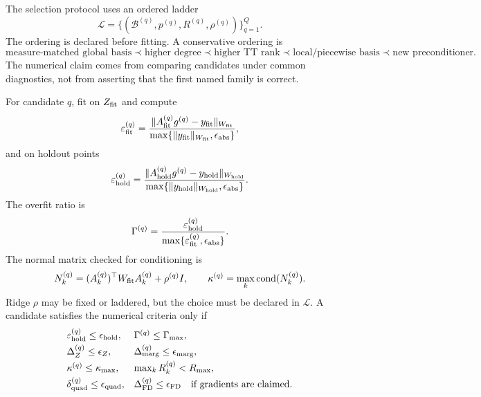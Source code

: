 \documentclass[11pt]{article}
\numberwithin{equation}{section}
\begin{document}
The selection protocol uses an ordered ladder
\begin{equation}
    \mathcal L
    =
    \{(\mathcal B^{(q)},p^{(q)},R^{(q)},\rho^{(q)})\}_{q=1}^{Q}.
    \label{eq:p33-ladder}
\end{equation}
The ordering is declared before fitting.  A conservative ordering is
\begin{equation}
    \text{measure-matched global basis}
    \prec
    \text{higher degree}
    \prec
    \text{higher TT rank}
    \prec
    \text{local/piecewise basis}
    \prec
    \text{new preconditioner}.
    \label{eq:p33-ladder-order}
\end{equation}
The numerical claim comes from comparing candidates under common diagnostics,
not from asserting that the first named family is correct.

For candidate \(q\), fit on \(Z_{\rm fit}\) and compute
\begin{equation}
    \varepsilon_{\rm fit}^{(q)}
    =
    \frac{\|A_{\rm fit}^{(q)}g^{(q)}-y_{\rm fit}\|_{W_{\rm fit}}}
         {\max\{\|y_{\rm fit}\|_{W_{\rm fit}},\epsilon_{\rm abs}\}},
    \label{eq:p33-fit-residual}
\end{equation}
and on holdout points
\begin{equation}
    \varepsilon_{\rm hold}^{(q)}
    =
    \frac{\|A_{\rm hold}^{(q)}g^{(q)}-y_{\rm hold}\|_{W_{\rm hold}}}
         {\max\{\|y_{\rm hold}\|_{W_{\rm hold}},\epsilon_{\rm abs}\}}.
    \label{eq:p33-hold-residual}
\end{equation}
The overfit ratio is
\begin{equation}
    \Gamma^{(q)}
    =
    \frac{\varepsilon_{\rm hold}^{(q)}}
         {\max\{\varepsilon_{\rm fit}^{(q)},\epsilon_{\rm abs}\}}.
    \label{eq:p33-overfit-ratio}
\end{equation}
The normal matrix checked for conditioning is
\begin{equation}
    N_k^{(q)}
    =
    (A_k^{(q)})^\top W_{\rm fit}A_k^{(q)}+\rho^{(q)}I,
    \qquad
    \kappa^{(q)}=\max_k\operatorname{cond}(N_k^{(q)}).
    \label{eq:p33-conditioning}
\end{equation}
Ridge \(\rho\) may be fixed or laddered, but the choice must be declared in
\(\mathcal L\).  A candidate satisfies the numerical criteria only if
\begin{equation}
\begin{array}{ll}
\varepsilon_{\rm hold}^{(q)}\le\epsilon_{\rm hold},&
\Gamma^{(q)}\le\Gamma_{\max},\\[1mm]
\Delta_Z^{(q)}\le\epsilon_Z,&
\Delta_{\rm marg}^{(q)}\le\epsilon_{\rm marg},\\[1mm]
\kappa^{(q)}\le\kappa_{\max},&
\max_k R_k^{(q)}<R_{\max},\\[1mm]
\delta_{\rm quad}^{(q)}\le\epsilon_{\rm quad},&
\Delta_{\rm FD}^{(q)}\le\epsilon_{\rm FD}\quad\text{if gradients are claimed}.
\end{array}
    \label{eq:p33-pass-criteria}
\end{equation}
\end{document}
